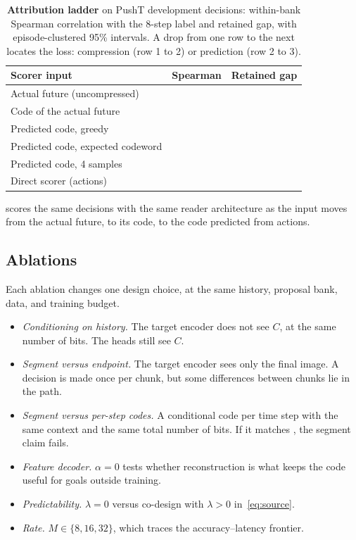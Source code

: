 \begin{table}[t]
\centering
\small
\begin{tabular}{@{}lcc@{}}
\toprule
Scorer input & Spearman & Retained gap \\
\midrule
Actual future (uncompressed) & \result{--} & \result{--} \\
Code of the actual future & \result{--} & \result{--} \\
Predicted code, greedy & \result{--} & \result{--} \\
Predicted code, expected codeword & \result{--} & \result{--} \\
Predicted code, 4 samples & \result{--} & \result{--} \\
Direct scorer (actions) & \result{--} & \result{--} \\
\bottomrule
\end{tabular}
\caption{\textbf{Attribution ladder} on PushT development decisions: within-bank Spearman correlation with the 8-step label and retained gap, with episode-clustered 95\% intervals. A drop from one row to the next locates the loss: compression (row 1 to 2) or prediction (row 2 to 3).}
\label{tab:ladder}
\end{table}

 scores the same decisions with the same reader architecture as the input moves from the actual future, to its code, to the code predicted from actions.

\subsection{Ablations}
\label{sec:ablations}
Each ablation changes one design choice, at the same history, proposal bank, data, and training budget.
\begin{itemize}[leftmargin=*,topsep=2pt,itemsep=1pt]
\item \emph{Conditioning on history.} The target encoder does not see $C$, at the same number of bits. The heads still see $C$.
\item \emph{Segment versus endpoint.} The target encoder sees only the final image. A decision is made once per chunk, but some differences between chunks lie in the path.
\item \emph{Segment versus per-step codes.} A conditional code per time step with the same context and the same total number of bits. If it matches \method, the segment claim fails. 
\item \emph{Feature decoder.} $\alpha{=}0$ tests whether reconstruction is what keeps the code useful for goals outside training.
\item \emph{Predictability.} $\lambda{=}0$ versus co-design with $\lambda{>}0$ in~\eqref{eq:source}.
\item \emph{Rate.} $M\in\{8,16,32\}$, which traces the accuracy--latency frontier.
\end{itemize}

